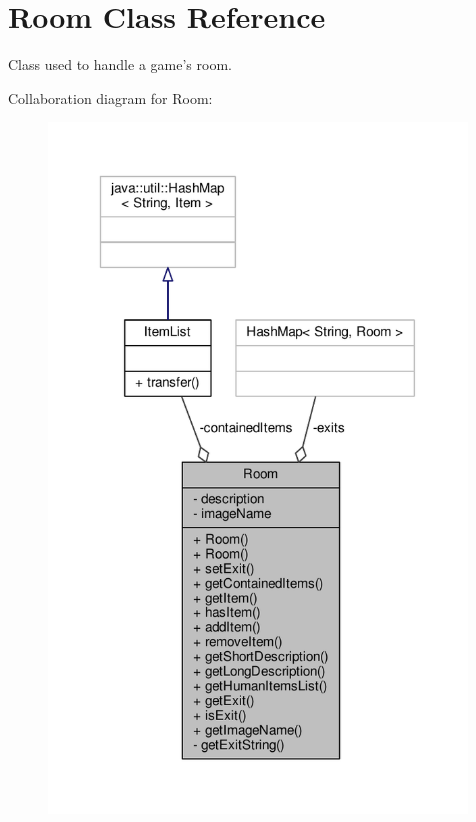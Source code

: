 \hypertarget{classRoom}{\section{Room Class Reference}
\label{classRoom}
}


Class used to handle a game's room.  




Collaboration diagram for Room\-:
\nopagebreak
\begin{figure}[H]
\begin{center}
\leavevmode
\includegraphics[width=315pt]{classRoom__coll__graph}
\end{center}
\end{figure}
